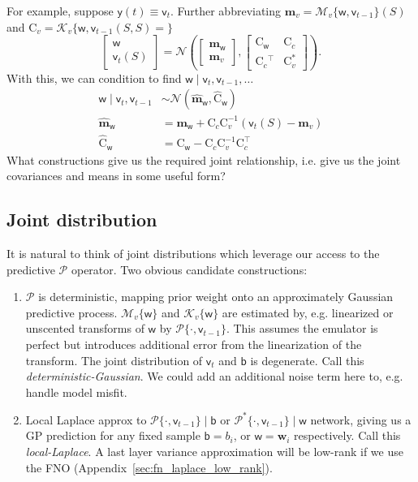 \documentclass{article}
\newcommand{\vv}[1]{\boldsymbol{#1}}
\newcommand{\mm}[1]{\mathrm{#1}}
\newcommand{\rv}[1]{\mathsf{#1}}
\newcommand{\vrv}[1]{\vv{\rv{#1}}}
\newcommand{\dist}[1]{\mathcal{#1}}
\newcommand{\set}[1]{#1}
\newcommand{\op}[1]{\mathscr{#1}}
\newcommand{\gvn}{\mid}
\newcommand{\lat}{\rv{b}}   %
\newcommand{\latst}{b}      %
\newcommand{\latwt}{\vrv{w}}
\newcommand{\latwtst}{\vv{w}}
\begin{document}
For example, suppose \(\rv{y}(t)\equiv\rv{v}_t\).
Further abbreviating \(\vv{m}_v=\op{M}_v\{\latwt,\rv{v}_{t-1}\}(\set{S})\) and \(\mm{C}_{v}=\op{K}_{v}\{\latwt,\rv{v}_{t-1}(\set{S},\set{S})=\}\)
\[\left[\begin{array}{c}
    \latwt\\ \rv{v}_{t}(\set{S})
\end{array}\right]
=\dist{N}\left(
    \left[\begin{array}{c}
        \vv{m}_{\latwt}\\
        \vv{m}_v
    \end{array}\right],
    \left[\begin{array}{cc}
        \mm{C}_{\latwt} & \mm{C}_{c}\\
        \mm{C}_{c}{}^\top& \mm{C}^*_{v}
    \end{array}\right]
\right).\]
With this, we can condition to find \(\latwt\gvn\rv{v}_{t},\rv{v}_{t-1},\dots\)
\begin{align*}
    \latwt\gvn\rv{v}_{t},\rv{v}_{t-1}&\sim\dist{N}(\hat{\vv{m}}_{\latwt},\hat{\mm{C}}_{\latwt} )\\
    \hat{\vv{m}}_{\latwt} &=\vv{m}_{\latwt}+\mm{C}_{c} \mm{C}_{v}^{-1}\left(\rv{v}_{t}(\set{S})-\vv{m}_{v}\right) \\
    \hat{\mm{C}}_{\latwt} &=\mm{C}_{\latwt}-\mm{C}_{c} \mm{C}_{v}^{-1} \mm{C}_{c}^{\top}
\end{align*}
What constructions give us the required joint relationship, i.e. give us the joint covariances and means in some useful form?

\subsection{Joint distribution}

It is natural to think of joint distributions which leverage our access to the predictive \(\op{P}\) operator.
Two obvious candidate constructions:
\begin{enumerate}
    \item \(\op{P}\) is deterministic, mapping prior weight onto an approximately Gaussian predictive process. 
    \(\op{M}_{v}\{\latwt\}\) and \(\op{K}_{v}\{\latwt\}\) are estimated by, e.g. linearized or unscented transforms of \(\latwt\) by \(\op{P}\{\cdot,\rv{v}_{t-1}\}\).
    This assumes the emulator is perfect but introduces additional error from the linearization of the transform.
    The joint distribution of \(\rv{v}_t\) and \(\lat\) is degenerate.
    Call this \emph{deterministic-Gaussian}.
    We could add an additional noise term here to, e.g. handle model misfit.
    \item Local Laplace approx to  \(\op{P}\{\cdot,\rv{v}_{t-1}\}\gvn \lat\) or \(\op{P}^*\{\cdot,\rv{v}_{t-1}\}\gvn \latwt\) network, giving us a GP prediction for any fixed sample \(\lat=\latst_i\), or \(\latwt=\latwtst_i\) respectively. Call this \emph{local-Laplace}.
    A last layer variance approximation will be low-rank if we use the FNO (Appendix~\ref{sec:fn_laplace_low_rank}). 
\end{enumerate}
\end{document}
